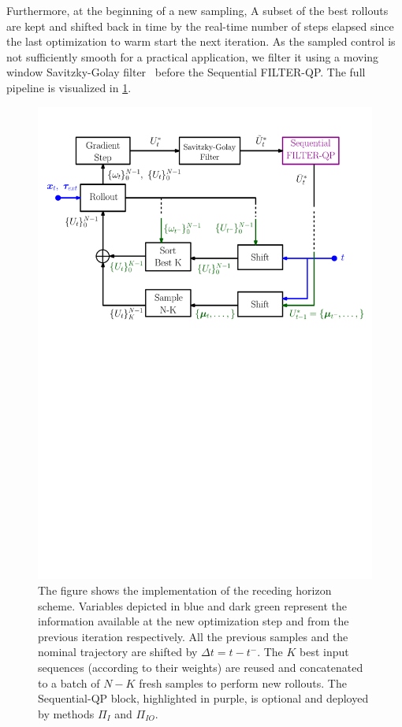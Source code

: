 Furthermore, at the beginning of a new sampling, A subset of the best rollouts are kept and shifted back in time by the real-time number of steps elapsed since the last optimization to warm start the next iteration. 
As the sampled control is not sufficiently smooth for a practical application, we filter it using a moving window Savitzky-Golay filter~\cite{gorry1990general} before the Sequential FILTER-QP. The full pipeline is visualized in \fig \ref{fig:receding_horizon}.

\begin{figure}[t]
    \centering
    \includegraphics[width=\columnwidth]{figures/schemes/receding_horizon.pdf}
    \vspace{0.1cm}
    \caption{The figure shows the implementation of the receding horizon scheme. Variables depicted in blue and dark green represent the information available at the new optimization step and from the previous iteration respectively. All the previous samples and the nominal trajectory are shifted by $\Delta t = t - t^-$. The $K$ best input sequences (according to their weights) are reused and concatenated to a batch of $N-K$ fresh samples to perform new rollouts. The Sequential-QP block, highlighted in purple, is optional and deployed by methods $\Pi_{I}$ and $\Pi_{IO}$.}
    \label{fig:receding_horizon}
\end{figure}

